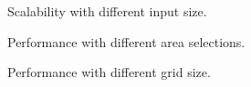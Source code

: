 \documentclass{sig-alternate-05-2015}
\begin{document}
\begin{figure}[t]
  \caption{Scalability with different input size.}
  \label{scalability}
\end{figure}
\begin{figure}[t]
  \caption{Performance with different area selections.}
  \label{square}
\end{figure}
\begin{figure}[t]
  \caption{Performance with different grid size.}
  \label{step}
\end{figure}
\end{document}
